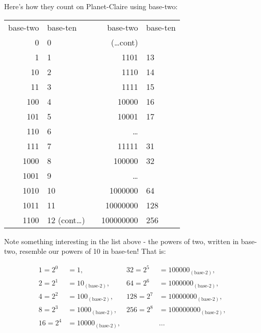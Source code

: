 \documentclass{article}
\begin{document}
Here's how they count on Planet-Claire using base-two:
\begin{center}
\begin{tabular}{r l c r l}
base-two & base-ten & \; \; \; \; & base-two & base-ten\\
0 & 0 & \phantom& (\dots cont)\\
1 & 1 & \phantom& 1101 & 13\\
10 & 2 & \phantom& 1110 & 14\\
11 & 3 & \phantom& 1111 & 15\\
100 & 4 & \phantom& 10000 & 16\\
101 & 5 & \phantom& 10001 & 17\\
110 & 6 & \phantom& \dots{}\\
111 & 7 & \phantom& 11111 & 31\\
1000 & 8 & \phantom& 100000 & 32\\
1001 & 9 & \phantom& \dots{}\\
1010 & 10 & \phantom & 1000000 & 64\\
1011 & 11 & \phantom& 10000000 & 128\\
1100 & 12 (cont\dots) & \phantom& 100000000 & 256\\
\end{tabular}
\end{center}

Note something interesting in the list above - the powers of two,
written in base-two,
resemble our powers of 10 in base-ten! That is:
\begin{small}
\begin{center}
\begin{spreadlines}{0em}
\begin{align*}
1 = 2^0&= 1, & 32 = 2^5&= 100000_{(\text{base-2})},\\
2 = 2^1&= 10_{(\text{base-2})}, & 64 = 2^6&= 1000000_{(\text{base-2})},\\
4 = 2^2&= 100_{(\text{base-2})}, & 128 = 2^7&= 10000000_{(\text{base-2})},\\
8 = 2^3&= 1000_{(\text{base-2})},& 256 = 2^8&= 100000000_{(\text{base-2})},\\
16 = 2^4&= 10000_{(\text{base-2})},& & \dots{}\\
\end{align*}
\end{spreadlines}
\end{center}
\end{small}
\end{document}
